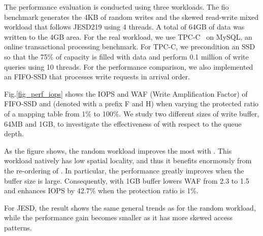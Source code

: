 The performance evaluation is conducted using three workloads.
The fio benchmark generates the 4KB of random writes and the
skewed read-write mixed workload that follows JESD219 using 4 threads. A
total of 64GB of data was written to the 4GB area. For the real workload, we use 
TPC-C~\cite{council1990tpc} on MySQL, an online transactional processing benchmark.
For TPC-C, we precondition an SSD so that the 75\% of capacity is filled with data
and perform 0.1 million of write queries using 10 threads.
For the performance comparison, we also implemented an FIFO-SSD that processes 
write requests in arrival order.  

Fig.\ref{fig_perf_iops} shows the IOPS and WAF (Write Amplification Factor) of FIFO-SSD and \ours{} (denoted with a prefix F and H) when varying the protected ratio of a mapping table from 1\% to 100\%. 
We study two different sizes of write
buffer, 64MB and 1GB, to investigate the effectiveness of \ours{} with respect
to the queue depth. 

As the figure shows, the random workload improves the most with \ours{}. 
This workload natively has low spatial locality, and thus it benefits enormously from the re-ordering of \ours{}. In particular, the performance greatly improves when the buffer size is large. 
Consequently, \ours{} with 1GB buffer lowers WAF from 2.3 to 1.5 and enhances IOPS by 42.7\% when the protection ratio is 1\%. 

For JESD, the result shows the same general trends as for the random workload, while the performance gain
becomes smaller as it has more skewed access patterns. 

